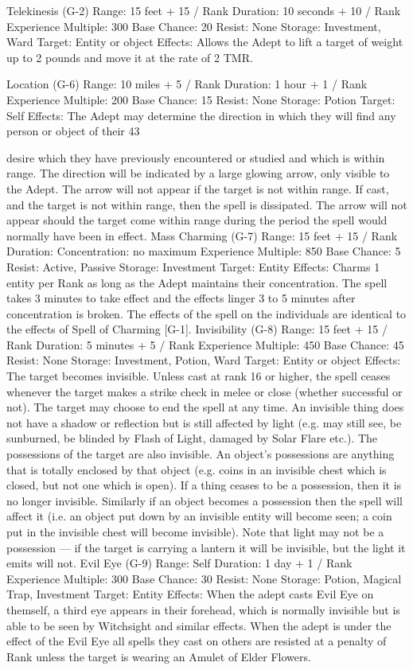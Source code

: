 \documentclass[a4paper]{article}
\begin{document}
\begin{multicols}{3}
Telekinesis (G-2)
Range: 15 feet + 15 / Rank
Duration: 10 seconds + 10 / Rank
Experience Multiple: 300
Base Chance: 20%
Resist: None
Storage: Investment, Ward
Target: Entity or object
Effects: Allows the Adept to lift a target of weight
up to 2 pounds and move it at the rate of 2 TMR.

Location (G-6)
Range: 10 miles + 5 / Rank
Duration: 1 hour + 1 / Rank
Experience Multiple: 200
Base Chance: 15%
Resist: None
Storage: Potion
Target: Self
Effects: The Adept may determine the direction in
which they will find any person or object of their
43

desire which they have previously encountered or
studied and which is within range. The direction
will be indicated by a large glowing arrow, only
visible to the Adept. The arrow will not appear if
the target is not within range. If cast, and the target
is not within range, then the spell is dissipated. The
arrow will not appear should the target come
within range during the period the spell would
normally have been in effect.
Mass Charming (G-7)
Range: 15 feet + 15 / Rank
Duration: Concentration: no maximum
Experience Multiple: 850
Base Chance: 5%
Resist: Active, Passive
Storage: Investment
Target: Entity
Effects: Charms 1 entity per Rank as long as the
Adept maintains their concentration. The spell
takes 3 minutes to take effect and the effects linger
3 to 5 minutes after concentration is broken.
The effects of the spell on the individuals are identical to the effects of Spell of Charming [G-1].
Invisibility (G-8)
Range: 15 feet + 15 / Rank
Duration: 5 minutes + 5 / Rank
Experience Multiple: 450
Base Chance: 45%
Resist: None
Storage: Investment, Potion, Ward
Target: Entity or object
Effects: The target becomes invisible. Unless cast
at rank 16 or higher, the spell ceases whenever the
target makes a strike check in melee or close
(whether successful or not). The target may choose
to end the spell at any time.
An invisible thing does not have a shadow or reflection but is still affected by light (e.g. may still
see, be sunburned, be blinded by Flash of Light,
damaged by Solar Flare etc.).
The possessions of the target are also invisible. An
object’s possessions are anything that is totally
enclosed by that object (e.g. coins in an invisible
chest which is closed, but not one which is open).
If a thing ceases to be a possession, then it is no
longer invisible. Similarly if an object becomes a
possession then the spell will affect it (i.e. an object put down by an invisible entity will become
seen; a coin put in the invisible chest will become
invisible). Note that light may not be a possession
— if the target is carrying a lantern it will be invisible, but the light it emits will not.
Evil Eye (G-9)
Range: Self
Duration: 1 day + 1 / Rank
Experience Multiple: 300
Base Chance: 30%
Resist: None
Storage: Potion, Magical Trap, Investment
Target: Entity
Effects: When the adept casts Evil Eye on themself, a third eye appears in their forehead, which is
normally invisible but is able to be seen by Witchsight and similar effects. When the adept is under
the effect of the Evil Eye all spells they cast on
others are resisted at a penalty of Rank unless the
target is wearing an Amulet of Elder Flowers.


\end{multicols}
\end{document}
